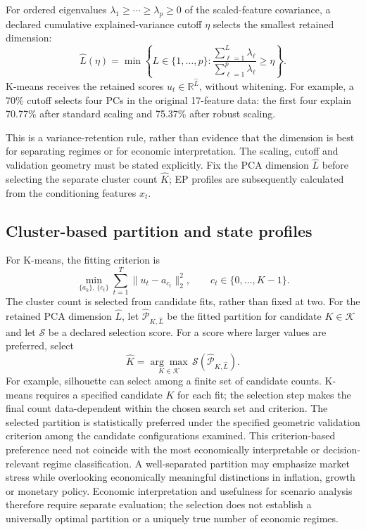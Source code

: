 \documentclass[11pt,a4paper]{article}
\begin{document}
For ordered eigenvalues $\lambda_1\geq\cdots\geq\lambda_p\geq0$ of the scaled-feature covariance, a declared cumulative explained-variance cutoff $\eta$ selects the smallest retained dimension:
\begin{equation}
\widehat L(\eta)=\min\left\{L\in\{1,\ldots,p\}:
\frac{\sum_{\ell=1}^{L}\lambda_\ell}{\sum_{\ell=1}^{p}\lambda_\ell}\geq\eta\right\}.
\label{eq:pca-dimension}
\end{equation}
K-means receives the retained scores $u_t\in\mathbb R^{\widehat L}$, without whitening. For example, a 70\% cutoff selects four PCs in the original 17-feature data: the first four explain 70.77\% after standard scaling and 75.37\% after robust scaling.

This is a variance-retention rule, rather than evidence that the dimension is best for separating regimes or for economic interpretation. The scaling, cutoff and validation geometry must be stated explicitly. Fix the PCA dimension $\widehat L$ before selecting the separate cluster count $\widehat K$; EP profiles are subsequently calculated from the conditioning features $x_t$.

\subsection{Cluster-based partition and state profiles}

For K-means, the fitting criterion is
\begin{equation}
\min_{\{a_k\},\,\{c_t\}}
\sum_{t=1}^{T}\|u_t-a_{c_t}\|_2^2,
\qquad c_t\in\{0,\ldots,K-1\}.
\end{equation}
The cluster count is selected from candidate fits, rather than fixed at two. For the retained PCA dimension $\widehat L$, let $\widehat{\mathcal P}_{K,\widehat L}$ be the fitted partition for candidate $K\in\mathcal K$ and let $\mathcal S$ be a declared selection score. For a score where larger values are preferred, select
\begin{equation}
\widehat K=\underset{K\in\mathcal K}{\arg\max}\,
\mathcal S(\widehat{\mathcal P}_{K,\widehat L}).
\label{eq:select-k}
\end{equation}
For example, silhouette can select among a finite set of candidate counts. K-means requires a specified candidate $K$ for each fit; the selection step makes the final count data-dependent within the chosen search set and criterion. The selected partition is statistically preferred under the specified geometric validation criterion among the candidate configurations examined. This criterion-based preference need not coincide with the most economically interpretable or decision-relevant regime classification. A well-separated partition may emphasize market stress while overlooking economically meaningful distinctions in inflation, growth or monetary policy. Economic interpretation and usefulness for scenario analysis therefore require separate evaluation; the selection does not establish a universally optimal partition or a uniquely true number of economic regimes.
\end{document}
